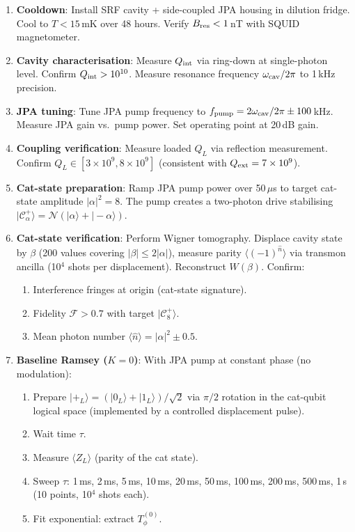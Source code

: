 \documentclass[11pt]{article}
\theoremstyle{definition}
\theoremstyle{remark}
\newcommand{\ee}[1]{\times 10^{#1}}
\begin{document}
\begin{enumerate}
\item \textbf{Cooldown}: Install SRF cavity + side-coupled JPA housing
  in dilution fridge. Cool to $T < 15$\,mK over 48 hours. Verify
  $B_{\rm res} < 1$\,nT with SQUID magnetometer.

\item \textbf{Cavity characterisation}: Measure $Q_{\rm int}$ via
  ring-down at single-photon level. Confirm $Q_{\rm int} > 10^{10}$.
  Measure resonance frequency $\omega_{\rm cav}/2\pi$ to 1\,kHz precision.

\item \textbf{JPA tuning}: Tune JPA pump frequency to
  $f_{\rm pump} = 2\omega_{\rm cav}/2\pi \pm 100$\,kHz. Measure JPA
  gain vs.\ pump power. Set operating point at 20\,dB gain.

\item \textbf{Coupling verification}: Measure loaded $Q_L$ via
  reflection measurement. Confirm $Q_L \in [3\ee{9}, 8\ee{9}]$
  (consistent with $Q_{\rm ext} = 7\ee{9}$).

\item \textbf{Cat-state preparation}: Ramp JPA pump power over
  50\,$\mu$s to target cat-state amplitude $|\alpha|^2 = 8$. The
  pump creates a two-photon drive stabilising
  $|\mathcal{C}_\alpha^+\rangle = \mathcal{N}(|\alpha\rangle +
  |-\alpha\rangle)$.

\item \textbf{Cat-state verification}: Perform Wigner tomography.
  Displace cavity state by $\beta$ (200 values covering
  $|\beta| \leq 2|\alpha|$), measure parity $\langle (-1)^{\hat n}
  \rangle$ via transmon ancilla (10$^4$ shots per displacement).
  Reconstruct $W(\beta)$. Confirm:
  \begin{enumerate}[nosep]
    \item Interference fringes at origin (cat-state signature).
    \item Fidelity $\mathcal{F} > 0.7$ with target $|\mathcal{C}_8^+
      \rangle$.
    \item Mean photon number $\langle \hat n \rangle = |\alpha|^2 \pm
      0.5$.
  \end{enumerate}

\item \textbf{Baseline Ramsey ($K=0$)}: With JPA pump at constant
  phase (no modulation):
  \begin{enumerate}[nosep]
    \item Prepare $|+_L\rangle = (|0_L\rangle + |1_L\rangle)/\sqrt{2}$
      via $\pi/2$ rotation in the cat-qubit logical space (implemented
      by a controlled displacement pulse).
    \item Wait time $\tau$.
    \item Measure $\langle Z_L \rangle$ (parity of the cat state).
    \item Sweep $\tau$: 1\,ms, 2\,ms, 5\,ms, 10\,ms, 20\,ms, 50\,ms,
      100\,ms, 200\,ms, 500\,ms, 1\,s (10 points, 10$^4$ shots each).
    \item Fit exponential: extract $T_\phi^{(0)}$.
  \end{enumerate}


\end{enumerate}
\end{document}
